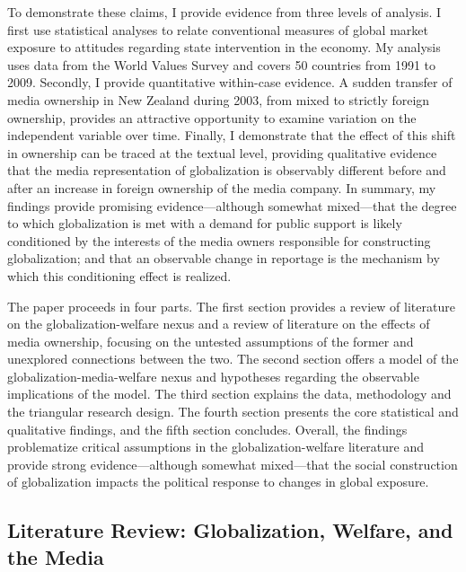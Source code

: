 \documentclass[a4paper]{article}
\begin{document}
	To demonstrate these claims, I provide evidence from three levels of analysis. I first use statistical analyses to relate conventional measures of global market exposure to attitudes regarding state intervention in the economy. My analysis uses data from the World Values Survey and covers 50 countries from 1991 to 2009. Secondly, I provide quantitative within-case evidence. A sudden transfer of media ownership in New Zealand during 2003, from mixed to strictly foreign ownership, provides an attractive opportunity to examine variation on the independent variable over time. Finally, I demonstrate that the effect of this shift in ownership can be traced at the textual level, providing qualitative evidence that the media representation of globalization is observably different before and after an increase in foreign ownership of the media company. In summary, my findings provide promising evidence---although somewhat mixed---that the degree to which globalization is met with a demand for public support is likely conditioned by the interests of the media owners responsible for constructing globalization; and that an observable change in reportage is the mechanism by which this conditioning effect is realized.

The paper proceeds in four parts. The first section provides a review of literature on the globalization-welfare nexus and a review of literature on the effects of media ownership, focusing on the untested assumptions of the former and unexplored connections between the two. The second section offers a model of the globalization-media-welfare nexus and hypotheses regarding the observable implications of the model. The third section explains the data, methodology and the triangular research design. The fourth section presents the core statistical and qualitative findings, and the fifth section concludes. Overall, the findings problematize critical assumptions in the globalization-welfare literature and provide strong evidence---although somewhat mixed---that the social construction of globalization impacts the political response to changes in global exposure.

\subsection{Literature Review: Globalization, Welfare, and the Media}
\end{document}

